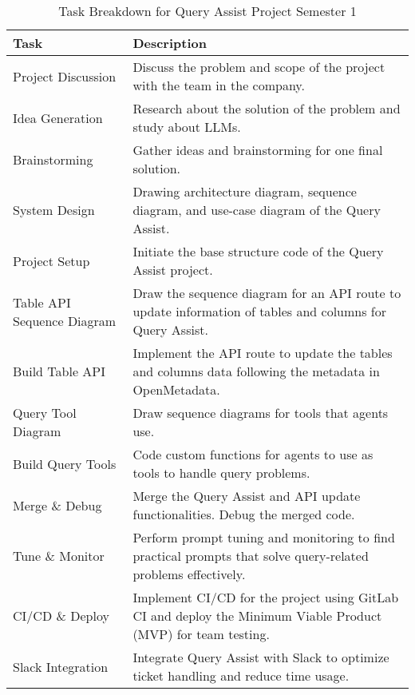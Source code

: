     \begin{table}[H]
        \centering
        \caption{Task Breakdown for Query Assist Project Semester 1}
        \label{tbl:task-breakdown-first-semester}
        \begin{tabular}{|p{4cm}|p{10cm}|}
            \hline
            \textbf{Task} & \textbf{Description} \\
            \hline
            Project Discussion & Discuss the problem and scope of the project with the team in the company. \\
            \hline
            Idea Generation & Research about the solution of the problem and study about LLMs. \\
            \hline
            Brainstorming & Gather ideas and brainstorming for one final solution. \\
            \hline
            System Design & Drawing architecture diagram, sequence diagram, and use-case diagram of the Query Assist. \\
            \hline
            Project Setup & Initiate the base structure code of the Query Assist project. \\
            \hline
            Table API Sequence Diagram & Draw the sequence diagram for an API route to update information of tables and columns for Query Assist. \\
            \hline
            Build Table API & Implement the API route to update the tables and columns data following the metadata in OpenMetadata. \\
            \hline
            Query Tool Diagram & Draw sequence diagrams for tools that agents use. \\
            \hline
            Build Query Tools & Code custom functions for agents to use as tools to handle query problems. \\
            \hline
            Merge \& Debug & Merge the Query Assist and API update functionalities. Debug the merged code. \\
            \hline
            Tune \& Monitor & Perform prompt tuning and monitoring to find practical prompts that solve query-related problems effectively. \\
            \hline
            CI/CD \& Deploy & Implement CI/CD for the project using GitLab CI and deploy the Minimum Viable Product (MVP) for team testing. \\
            \hline
            Slack Integration & Integrate Query Assist with Slack to optimize ticket handling and reduce time usage. \\

\end{tabular}
\end{table}
